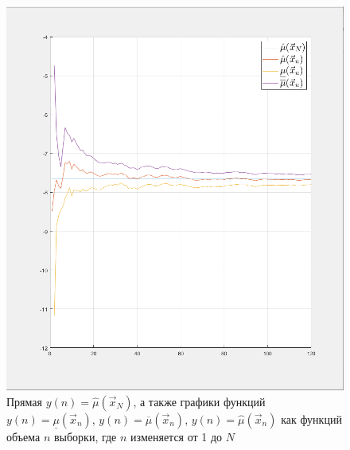 \documentclass[12pt]{report}
\begin{document}
\begin{figure}[h!]
	\centering
	\includegraphics[width=\textwidth]{img/f1}
	\caption{Прямая $y(n) = \hat\mu(\vec x_N)$, а также графики функций $y(n) = \underline\mu(\vec x_n)$, $y(n) = \overline\mu(\vec x_n)$, $y(n) = \hat\mu(\vec x_n)$ как функций объема $n$ выборки, где $n$ изменяется от 1 до $N$}
\end{figure}

\newpage
\end{document}
